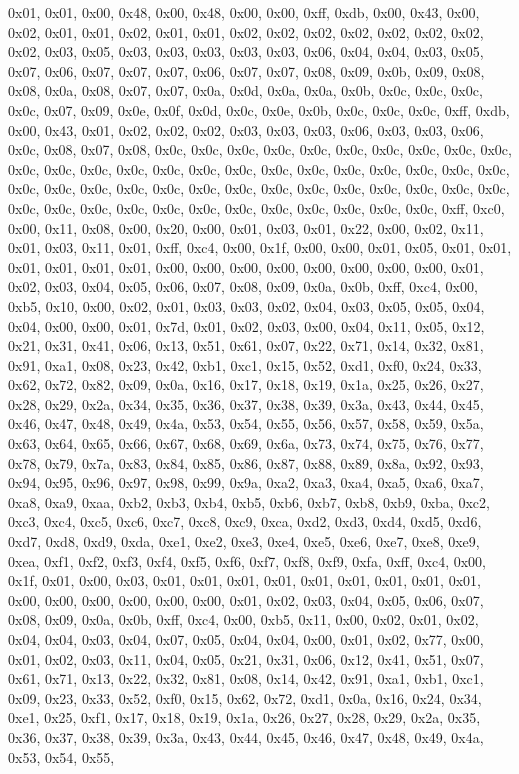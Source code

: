 \documentclass[
]{book}
\begin{document}
0x01, 0x01, 0x00, 0x48, 0x00, 0x48, 0x00, 0x00, 0xff, 0xdb, 0x00, 0x43, 0x00, 0x02, 0x01, 0x01, 0x02, 0x01, 0x01, 0x02, 0x02, 0x02, 0x02, 0x02, 0x02, 0x02, 0x02, 0x03, 0x05, 0x03, 0x03, 0x03, 0x03, 0x03, 0x06, 0x04, 0x04, 0x03, 0x05, 0x07, 0x06, 0x07, 0x07, 0x07, 0x06, 0x07, 0x07, 0x08, 0x09, 0x0b, 0x09, 0x08, 0x08, 0x0a, 0x08, 0x07, 0x07, 0x0a, 0x0d, 0x0a, 0x0a, 0x0b, 0x0c, 0x0c, 0x0c, 0x0c, 0x07, 0x09, 0x0e, 0x0f, 0x0d, 0x0c, 0x0e, 0x0b, 0x0c, 0x0c, 0x0c, 0xff, 0xdb, 0x00, 0x43, 0x01, 0x02, 0x02,
0x02, 0x03, 0x03, 0x03, 0x06, 0x03, 0x03, 0x06, 0x0c, 0x08, 0x07, 0x08, 0x0c, 0x0c, 0x0c, 0x0c, 0x0c, 0x0c, 0x0c, 0x0c, 0x0c, 0x0c, 0x0c, 0x0c, 0x0c, 0x0c, 0x0c, 0x0c, 0x0c, 0x0c, 0x0c, 0x0c, 0x0c, 0x0c, 0x0c, 0x0c, 0x0c, 0x0c, 0x0c, 0x0c, 0x0c, 0x0c, 0x0c, 0x0c, 0x0c, 0x0c, 0x0c, 0x0c, 0x0c, 0x0c, 0x0c, 0x0c, 0x0c, 0x0c, 0x0c, 0x0c, 0x0c, 0x0c, 0x0c, 0x0c, 0x0c, 0x0c, 0xff, 0xc0, 0x00, 0x11, 0x08, 0x00, 0x20, 0x00, 0x01, 0x03, 0x01, 0x22, 0x00, 0x02, 0x11, 0x01, 0x03, 0x11, 0x01, 0xff, 0xc4, 0x00,
0x1f, 0x00, 0x00, 0x01, 0x05, 0x01, 0x01, 0x01, 0x01, 0x01, 0x01, 0x00, 0x00, 0x00, 0x00, 0x00, 0x00, 0x00, 0x00, 0x01, 0x02, 0x03, 0x04, 0x05, 0x06, 0x07, 0x08, 0x09, 0x0a, 0x0b, 0xff, 0xc4, 0x00, 0xb5, 0x10, 0x00, 0x02, 0x01, 0x03, 0x03, 0x02, 0x04, 0x03, 0x05, 0x05, 0x04, 0x04, 0x00, 0x00, 0x01, 0x7d, 0x01, 0x02, 0x03, 0x00, 0x04, 0x11, 0x05, 0x12, 0x21, 0x31, 0x41, 0x06, 0x13, 0x51, 0x61, 0x07, 0x22, 0x71, 0x14, 0x32, 0x81, 0x91, 0xa1, 0x08, 0x23, 0x42, 0xb1, 0xc1, 0x15, 0x52, 0xd1, 0xf0, 0x24,
0x33, 0x62, 0x72, 0x82, 0x09, 0x0a, 0x16, 0x17, 0x18, 0x19, 0x1a, 0x25, 0x26, 0x27, 0x28, 0x29, 0x2a, 0x34, 0x35, 0x36, 0x37, 0x38, 0x39, 0x3a, 0x43, 0x44, 0x45, 0x46, 0x47, 0x48, 0x49, 0x4a, 0x53, 0x54, 0x55, 0x56, 0x57, 0x58, 0x59, 0x5a, 0x63, 0x64, 0x65, 0x66, 0x67, 0x68, 0x69, 0x6a, 0x73, 0x74, 0x75, 0x76, 0x77, 0x78, 0x79, 0x7a, 0x83, 0x84, 0x85, 0x86, 0x87, 0x88, 0x89, 0x8a, 0x92, 0x93, 0x94, 0x95, 0x96, 0x97, 0x98, 0x99, 0x9a, 0xa2, 0xa3, 0xa4, 0xa5, 0xa6, 0xa7, 0xa8, 0xa9, 0xaa, 0xb2, 0xb3,
0xb4, 0xb5, 0xb6, 0xb7, 0xb8, 0xb9, 0xba, 0xc2, 0xc3, 0xc4, 0xc5, 0xc6, 0xc7, 0xc8, 0xc9, 0xca, 0xd2, 0xd3, 0xd4, 0xd5, 0xd6, 0xd7, 0xd8, 0xd9, 0xda, 0xe1, 0xe2, 0xe3, 0xe4, 0xe5, 0xe6, 0xe7, 0xe8, 0xe9, 0xea, 0xf1, 0xf2, 0xf3, 0xf4, 0xf5, 0xf6, 0xf7, 0xf8, 0xf9, 0xfa, 0xff, 0xc4, 0x00, 0x1f, 0x01, 0x00, 0x03, 0x01, 0x01, 0x01, 0x01, 0x01, 0x01, 0x01, 0x01, 0x01, 0x00, 0x00, 0x00, 0x00, 0x00, 0x00, 0x01, 0x02, 0x03, 0x04, 0x05, 0x06, 0x07, 0x08, 0x09, 0x0a, 0x0b, 0xff, 0xc4, 0x00, 0xb5, 0x11, 0x00,
0x02, 0x01, 0x02, 0x04, 0x04, 0x03, 0x04, 0x07, 0x05, 0x04, 0x04, 0x00, 0x01, 0x02, 0x77, 0x00, 0x01, 0x02, 0x03, 0x11, 0x04, 0x05, 0x21, 0x31, 0x06, 0x12, 0x41, 0x51, 0x07, 0x61, 0x71, 0x13, 0x22, 0x32, 0x81, 0x08, 0x14, 0x42, 0x91, 0xa1, 0xb1, 0xc1, 0x09, 0x23, 0x33, 0x52, 0xf0, 0x15, 0x62, 0x72, 0xd1, 0x0a, 0x16, 0x24, 0x34, 0xe1, 0x25, 0xf1, 0x17, 0x18, 0x19, 0x1a, 0x26, 0x27, 0x28, 0x29, 0x2a, 0x35, 0x36, 0x37, 0x38, 0x39, 0x3a, 0x43, 0x44, 0x45, 0x46, 0x47, 0x48, 0x49, 0x4a, 0x53, 0x54, 0x55,
\end{document}
